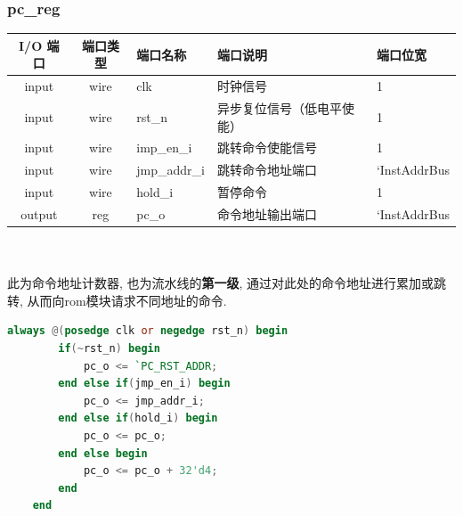 \documentclass[lang=cn,11pt,a4paper,chinesefont=founder]{elegantpaper}
\begin{document}
\subsubsection{pc\_reg}
\begin{tabular}{cclll}
    \toprule
    I/O 端口 & 端口类型 & 端口名称     & 端口说明                   & 端口位宽     \\
    \midrule
    input    & wire     & clk          & 时钟信号                   & 1            \\
    input    & wire     & rst\_n       & 异步复位信号（低电平使能） & 1            \\
    input    & wire     & imp\_en\_i   & 跳转命令使能信号           & 1            \\
    input    & wire     & jmp\_addr\_i & 跳转命令地址端口           & `InstAddrBus \\
    input    & wire     & hold\_i      & 暂停命令                   & 1            \\
    output   & reg      & pc\_o        & 命令地址输出端口           & `InstAddrBus \\
    \bottomrule
\end{tabular}\\
\\
此为命令地址计数器, 也为流水线的\textbf{第一级}, 通过对此处的命令地址进行累加或跳转, 从而向rom模块请求不同地址的命令. 
\begin{lstlisting}[language=verilog]
    always @(posedge clk or negedge rst_n) begin
		if(~rst_n) begin
			pc_o <= `PC_RST_ADDR;
		end else if(jmp_en_i) begin
			pc_o <= jmp_addr_i;
		end else if(hold_i) begin
			pc_o <= pc_o;
		end else begin
			pc_o <= pc_o + 32'd4;
		end
	end
\end{lstlisting}
\end{document}
